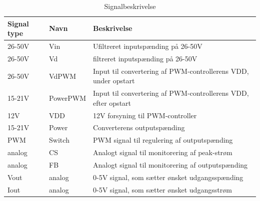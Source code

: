 \begin{table}[htbp]
	\centering
	\begin{tabular}{|l|l|l|}
		\hline
		\textbf{Signal type} 	&\textbf{Navn}		&\textbf{Beskrivelse} \\\hline
		26-50V			&Vin		&Ufiltreret inputspænding på 26-50V\\\hline
		26-50V			&Vd			&filtreret inputspænding på 26-50V\\\hline
		26-50V			&VdPWM			&Input til convertering af PWM-controllerens VDD, under opstart\\\hline
		15-21V			&PowerPWM		&Input til convertering af PWM-controllerens VDD, efter opstart\\\hline
		12V				&VDD		&12V forsyning til PWM-controller\\\hline
		15-21V			&Power		&Converterens outputspænding\\\hline
		PWM				&Switch		&PWM signal til regulering af outputspænding\\\hline
		analog			&CS			&Analogt signal til monitorering af peak-strøm   \\\hline	
		analog			&FB			&Analogt signal til monitorering af outputspænding\\\hline
		Vout			&analog		&0-5V signal, som sætter ønsket udgangsspænding\\\hline
		Iout			&analog		&0-5V signal, som sætter ønsket udgangsstrøm\\\hline
		
	\end{tabular}
	\caption{Signalbeskrivelse}
	\label{tabel: Signalbeskrivelse}
\end{table}

